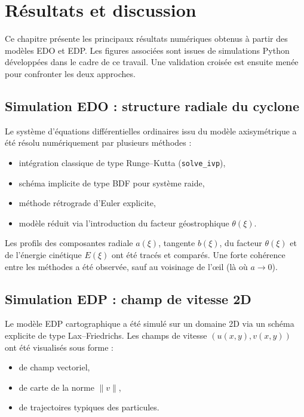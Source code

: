 \chapter{R\'esultats et discussion}

Ce chapitre pr\'esente les principaux r\'esultats num\'eriques obtenus \`a partir des mod\`eles EDO et EDP. Les figures associ\'ees sont issues de simulations Python d\'evelopp\'ees dans le cadre de ce travail. Une validation croisée est ensuite men\'ee pour confronter les deux approches.

\section{Simulation EDO : structure radiale du cyclone}

Le syst\`eme d'\'equations diff\'erentielles ordinaires issu du mod\`ele axisym\'etrique a \'et\'e r\'esolu num\'eriquement par plusieurs m\'ethodes :
\begin{itemize}
    \item int\'egration classique de type Runge--Kutta (\texttt{solve\_ivp}),
    \item sch\'ema implicite de type BDF pour syst\`eme raide,
    \item m\'ethode r\'etrograde d'Euler explicite,
    \item mod\`ele r\'eduit via l'introduction du facteur g\'eostrophique $\theta(\xi)$.
\end{itemize}

Les profils des composantes radiale $a(\xi)$, tangente $b(\xi)$, du facteur $\theta(\xi)$ et de l'\'energie cin\'etique $E(\xi)$ ont \'et\'e trac\'es et compar\'es. Une forte coh\'erence entre les m\'ethodes a \'et\'e observ\'ee, sauf au voisinage de l'\oe il (l\`a o\`u $a \to 0$).

\section{Simulation EDP : champ de vitesse 2D}

Le mod\`ele EDP cartographique a \'et\'e simul\'e sur un domaine 2D via un sch\'ema explicite de type Lax--Friedrichs. Les champs de vitesse $(u(x,y), v(x,y))$ ont \'et\'e visualis\'es sous forme :
\begin{itemize}
    \item de champ vectoriel,
    \item de carte de la norme $\|v\|$,
    \item de trajectoires typiques des particules.
\end{itemize}

